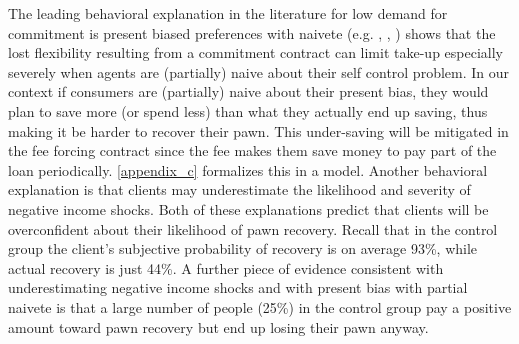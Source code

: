\documentclass[oneside,11pt]{article}
\begin{document}
The leading behavioral explanation in the literature for low demand for commitment is present biased preferences with naivete (e.g. \cite{Rabin2018}, \cite{John}, \cite{Laibson2018})  \cite{Laibson2015} shows that the lost flexibility resulting from a commitment contract can limit take-up especially severely when agents are (partially) naive about their self control problem. In our context if consumers are (partially) naive about their present bias, they would plan to save more (or spend less) than what they actually end up saving, thus making it be harder to recover their pawn. This under-saving will be mitigated in the fee forcing contract since the fee makes them save money to pay part of the loan periodically. \ref{appendix_c} formalizes this in a model. Another behavioral explanation is that clients may underestimate the likelihood and severity of negative income shocks. Both of these explanations predict that clients will be overconfident about their likelihood of pawn recovery. Recall that in the control group the client's subjective probability of recovery is on average 93\%, while actual recovery is just 44\%. A further piece of evidence consistent with underestimating negative income shocks and with present bias with partial naivete is that a large number of people (25\%) in the control group pay a positive amount toward pawn recovery but end up losing their pawn anyway.
\end{document}
